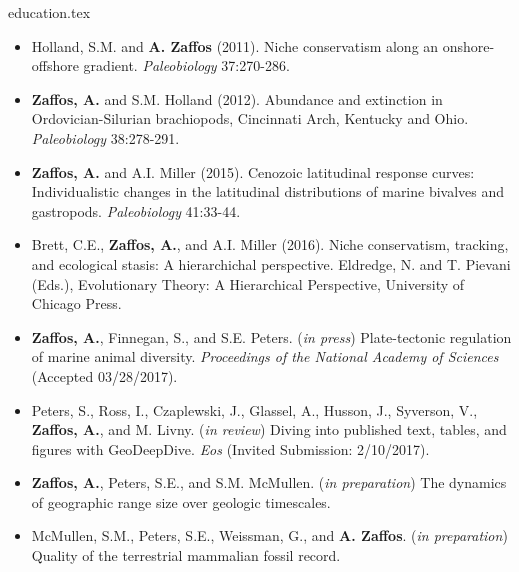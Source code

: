 \documentclass[12pt, a4paper]{awesome-cv}
\newcommand*{\sectiondir}{resume/}
\begin{document}
\makecvheader

{education.tex}
\vspace{-20pt}

\fontsize{10pt}{1em}\bodyfontlight\upshape\color{text}
\begin{itemize}[leftmargin=*]
\item{Holland, S.M. and \textbf{A. Zaffos} (2011). Niche conservatism along an onshore-offshore gradient. \textit{Paleobiology} 37:270-286.}
\item{\textbf{Zaffos, A.} and S.M. Holland (2012). Abundance and extinction in Ordovician-Silurian brachiopods, Cincinnati Arch, Kentucky and Ohio. \textit{Paleobiology} 38:278-291.}
\item{\textbf{Zaffos, A.} and A.I. Miller (2015). Cenozoic latitudinal response curves: Individualistic changes in the latitudinal distributions of marine bivalves and gastropods. \textit{Paleobiology} 41:33-44.}
\item{Brett, C.E., \textbf{Zaffos, A.}, and A.I. Miller (2016). Niche conservatism, tracking, and ecological stasis: A hierarchichal perspective. Eldredge, N. and T. Pievani (Eds.), Evolutionary Theory: A Hierarchical Perspective, University of Chicago Press.}
\item{\textbf{Zaffos, A.}, Finnegan, S., and S.E. Peters. (\textit{in press}) Plate-tectonic regulation of marine animal diversity. \textit{Proceedings of the National Academy of Sciences} (Accepted 03/28/2017).}
\item{Peters, S., Ross, I., Czaplewski, J., Glassel, A., Husson, J., Syverson, V., \textbf{Zaffos, A.}, and M. Livny. (\textit{in review}) Diving into published text, tables, and figures with GeoDeepDive. \textit{Eos} (Invited Submission: 2/10/2017).}
\item{\textbf{Zaffos, A.}, Peters, S.E., and S.M. McMullen. (\textit{in preparation}) The dynamics of geographic range size over geologic timescales.}
\item{McMullen, S.M., Peters, S.E., Weissman, G., and \textbf{A. Zaffos}. (\textit{in preparation}) Quality of the terrestrial mammalian fossil record.}
\end{itemize}
\end{document}
